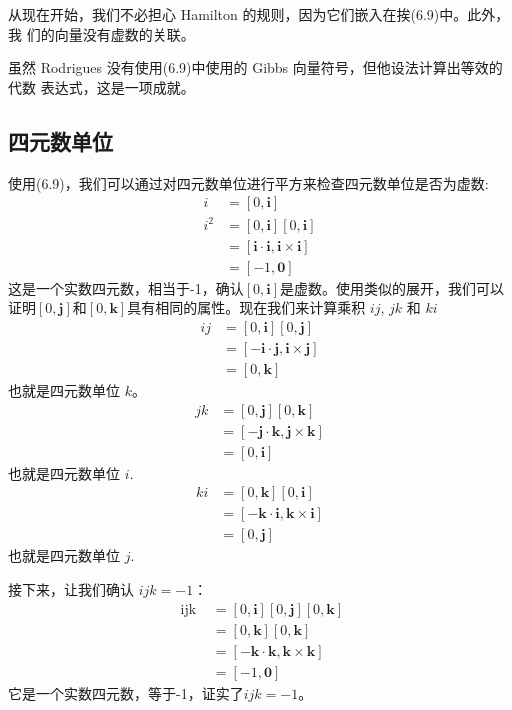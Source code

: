从现在开始，我们不必担心 Hamilton 的规则，因为它们嵌入在挨(6.9)中。此外，我
们的向量没有虚数的关联。

虽然 Rodrigues 没有使用(6.9)中使用的 Gibbs 向量符号，但他设法计算出等效的代数
表达式，这是一项成就。

\subsection{四元数单位}
使用(6.9)，我们可以通过对四元数单位进行平方来检查四元数单位是否为虚数:
$$
    \begin{aligned}
        i     & =[0, \mathbf{i}]                                             \\
        i^{2} & =[0, \mathbf{i}][0, \mathbf{i}]                              \\
              & =[\mathbf{i} \cdot \mathbf{i}, \mathbf{i} \times \mathbf{i}] \\
              & =[-1, \mathbf{0}]
    \end{aligned}
$$
这是一个实数四元数，相当于-1，确认$[0,\mathbf{i}]$是虚数。使用类似的展开，我们可以证明$[0,\mathbf{j}]$和$[0,\mathbf{k}]$具有相同的属性。现在我们来计算乘积 $i j$,  $j k$ 和 $k i$
$$
    \begin{aligned}
        i j & =[0, \mathbf{i}][0, \mathbf{j}]                               \\
            & =[-\mathbf{i} \cdot \mathbf{j}, \mathbf{i} \times \mathbf{j}] \\
            & =[0, \mathbf{k}]
    \end{aligned}
$$
也就是四元数单位 $k$。
$$
    \begin{aligned}
        j k & =[0, \mathbf{j}][0, \mathbf{k}]                               \\
            & =[-\mathbf{j} \cdot \mathbf{k}, \mathbf{j} \times \mathbf{k}] \\
            & =[0, \mathbf{i}]
    \end{aligned}
$$
也就是四元数单位 $i$.
$$
    \begin{aligned}
        k i & =[0, \mathbf{k}][0, \mathbf{i}]                               \\
            & =[-\mathbf{k} \cdot \mathbf{i}, \mathbf{k} \times \mathbf{i}] \\
            & =[0, \mathbf{j}]
    \end{aligned}
$$
也就是四元数单位 $j$.

接下来，让我们确认 $i j k=-1$：
$$
    \begin{aligned}
        \text { ijk } & =[0, \mathbf{i}][0, \mathbf{j}][0, \mathbf{k}]                \\
                      & =[0, \mathbf{k}][0, \mathbf{k}]                               \\
                      & =[-\mathbf{k} \cdot \mathbf{k}, \mathbf{k} \times \mathbf{k}] \\
                      & =[-1, \mathbf{0}]
    \end{aligned}
$$
它是一个实数四元数，等于-1，证实了$i j k=-1$。

